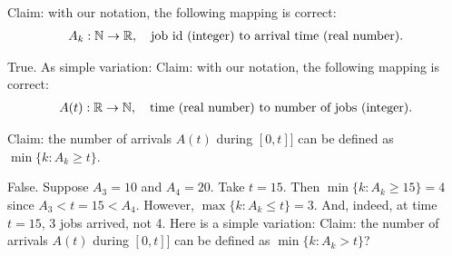 \documentclass[stochastic-or.tex]{subfiles}
\begin{document}
\begin{truefalse}
Claim: with our notation, the following mapping is correct:
\begin{align*}
 A_k : \mathbb{N} \to \mathbb{R}, \quad{\text{job id (integer) to arrival time (real number)}}.
\end{align*}
\begin{solution}
True. As simple variation: Claim: with our notation, the following mapping is correct:
\begin{align*}
 A(t) : \mathbb{R}\to \mathbb{N}, \quad{\text{time (real number) to number of jobs (integer)}}.
\end{align*}
\end{solution}
\end{truefalse}


\begin{truefalse}
Claim: the number of arrivals $A(t)$ during $[0, t]]$ can be defined as $\min\{k : A_k \geq t\}$.
\begin{solution}
False.
  Suppose $A_3 = 10$ and $A_4 = 20$.
  Take $t=15$.
  Then $\min\{k : A_k \geq 15\} = 4$ since $A_3 < t=15 < A_4$.
However, $\max\{k : A_k \leq t\} = 3$.
  And, indeed, at time $t=15$, 3 jobs arrived, not 4.
Here is a simple variation: Claim: the number of arrivals $A(t)$ during $[0, t]]$ can be defined as $\min\{k: A_k > t\}$?
\end{solution}
\end{truefalse}
\end{document}
